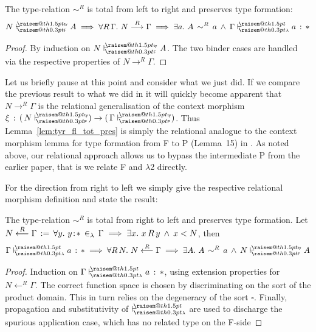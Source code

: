 \documentclass[a4paper,UKenglish]{lipics-v2016}
\makeatletter
\newcommand{\ms}{\,}
\newcommand{\mrel}[1]{\mathrel{\ms #1 \ms}}
\newcommand{\OF}{\mrel{:}}
\newcommand{\mAnd}{\mrel{\wedge}}
\newcommand{\mAll}[1]{\ensuremath{\forall} #1.\ms\ms}
\newcommand{\mEx}[1]{\ensuremath{\exists} #1.\ms\ms}
\newcommand{\eqdef}{\mrel{:=}}
\newcommand{\SysL}{$\lambda$2\xspace}
\newcommand{\ty}{\mathsf{ty}}
\newcommand{\of}{\ensuremath{\!:\!}}
\newcommand{\raisemath}[1]{\mathpalette{\raisem@th{#1}}}
\newcommand{\raisem@th}[3]{\raisebox{#1}{\ensuremath{#2#3}}}
\newcommand{\tsAnnot}[2]{\vdash\hspace{-.7em}^{\raisemath{1.5pt}{\scriptscriptstyle{#2}}}_{\raisemath{0.3pt}{\scriptscriptstyle{#1}}}} %
\newcommand{\cts}[2]{\ensuremath{(\,#1 #2 {})}} %
\newcommand{\tfF}{\tsAnnot{\mathsf{F}}{\ty}}  %
\newcommand{\istyF}[2]{\ensuremath{{#1} \mathrel{\tfF} #2}}
\newcommand{\tyL}{\tsAnnot{\lambda}{}} %
\newcommand{\typingL}[3]{\ensuremath{{#1} \mathrel{\tyL} #2 \OF #3}}
\newcommand{\inL}{\mrel{\in_{\lambda}}}
\newcommand{\tfP}{\tsAnnot{\mathsf{P}}{\ty}}  %
\newcommand{\tyr}{\mathrel{\sim}}
\newcommand{\tyctxrelFL}[3]{\ensuremath{#1\mathrel{\mathop{\longrightarrow}^{#2}\limits}#3}}
\newcommand{\tyctxrelLF}[3]{\ensuremath{#1\mathrel{\mathop{\longleftarrow}^{#2}\limits}#3}}
\newcommand{\Prp}{\ensuremath{\textrm{\textasteriskcentered}}}
\newcommand{\Typ}{\ensuremath{\square}}
\makeatother
\begin{document}
\begin{lemma}
  \label{lem:tyr_fl_tot_pres}
  The type-relation $\tyr^R$ is total from left to right and preserves type formation:
  \begin{align*}
    \istyF{N}{A} \implies \mAll {R\,\Gamma} \tyctxrelFL{N}{R}{\Gamma} \implies \mEx a A\,\tyr^R\,a \mAnd \typingL{\Gamma}{a}{\Prp}
  \end{align*}
\end{lemma}
\begin{proof}
  By induction on $\istyF{N}{A}$. The two binder cases are handled via the respective properties of $\tyctxrelFL{N}{R}{\Gamma}$.
\end{proof}
Let us briefly pause at this point and consider what we just did.
If we compare the previous result to what we did in \cite{KaiserEtAl:2017:sysf_pts_equiv_coq} it will quickly become apparent that $\tyctxrelFL{N}{R}{\Gamma}$ is the relational generalisation of the context morphism $\xi\ms:\ms\cts{N}{\tfF}\to\cts{\Gamma}{\tfP}$.
Thus Lemma~\ref{lem:tyr_fl_tot_pres} is simply the relational analogue to the context morphism lemma for type formation from F to P (Lemma~15) in \cite{KaiserEtAl:2017:sysf_pts_equiv_coq}.
As noted above, our relational approach allows us to bypass the intermediate P from the earlier paper, that is we relate F and \SysL directly.

For the direction from right to left we simply give the respective relational morphism definition and state the result:
\begin{lemma}
  \label{lem:tyr_lf_tot_pres}
  The type-relation $\tyr^R$ is total from right to left and preserves type formation.
  Let $\tyctxrelLF{N}{R}{\Gamma} \eqdef \mAll {y} y\of\Prp \inL \Gamma \implies \mEx x x\,R\,y \mAnd x < N$, then
  \begin{align*}
    \typingL{\Gamma}{a}{\Prp} \implies \mAll {R\,N} \tyctxrelLF{N}{R}{\Gamma} \implies \mEx A A\,\tyr^R\,a \mAnd \istyF{N}{A}
  \end{align*}
\end{lemma}
\begin{proof}
  Induction on $\typingL{\Gamma}{a}{\Prp}$, using extension properties for $\tyctxrelLF{N}{R}{\Gamma}$.
  The correct function space is chosen by discriminating on the sort of the product domain.
  This in turn relies on the degeneracy of the sort $\Typ$.
  Finally, propagation and substitutivity of $\tyL$ are used to discharge the spurious application case, which has no related type on the F-side
\end{proof}
\end{document}
